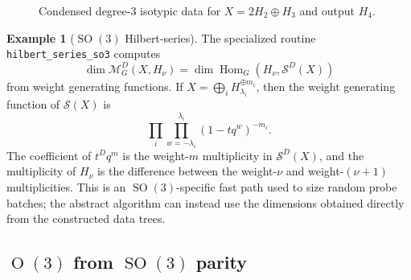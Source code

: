 \documentclass[11pt]{article}
\newcommand{\scM}{\mathcal{M}}
\newcommand{\scS}{\mathcal{S}}
\newcommand{\HomG}[2]{\operatorname{Hom}_G\!\left(#1,#2\right)}
\newcommand{\SO}{\operatorname{SO}}
\newcommand{\Orth}{\operatorname{O}}
\theoremstyle{definition}
\newtheorem{example}[theorem]{Example}
\begin{document}
\begin{landscape}
\begin{figure}[p]
{%
    }
    \endgroup
    \caption{Condensed degree-$3$ isotypic data for $X=2H_2\oplus H_3$ and output $H_4$.}
    \label{fig:so3-degree-three-isotypic-tree}
  \end{figure}
\end{landscape}

\begin{example}[$\SO(3)$ Hilbert-series]\label{ex:so3-hilbert-shortcut}
  The specialized routine \texttt{hilbert\_series\_so3} computes
  \[
    \dim \scM_G^D(X,H_\nu)
    =
    \dim \HomG{H_\nu}{\scS^D(X)}
  \]
  from weight generating functions.
  If $X=\bigoplus_i H_{\lambda_i}^{\oplus m_i}$, then the weight generating function of $\scS(X)$ is
  \[
    \prod_i\prod_{w=-\lambda_i}^{\lambda_i}(1-tq^w)^{-m_i}.
  \]
  The coefficient of $t^Dq^m$ is the weight-$m$ multiplicity in $\scS^D(X)$, and the multiplicity of $H_\nu$ is the difference between the weight-$\nu$ and weight-$(\nu+1)$ multiplicities.
  This is an $\SO(3)$-specific fast path used to size random probe batches; the abstract algorithm can instead use the dimensions obtained directly from the constructed data trees.
\end{example}

\subsection{\texorpdfstring{$\Orth(3)$ from $\SO(3)$ parity}{O(3) from SO(3) parity}}\label{sec:examples-o3}
\end{document}
